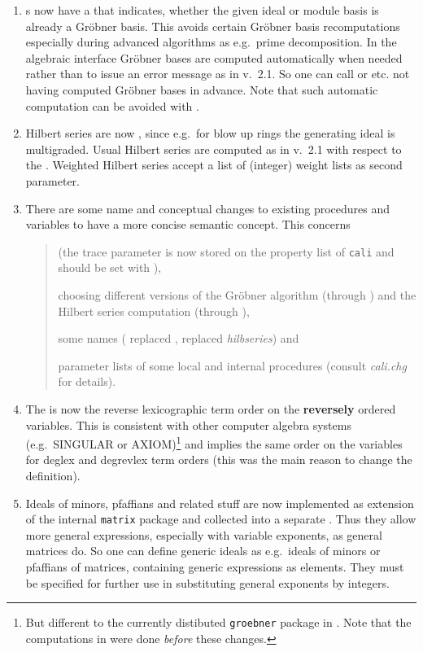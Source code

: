 \begin{enumerate}
\item {}s now have a  that indicates, whether the
given ideal or module basis is already a Gr\"obner basis. This avoids
certain Gr\"obner basis recomputations especially during advanced algorithms
as e.g.\ prime decomposition. In the algebraic interface Gr\"obner bases are
computed automatically when needed rather than to issue an error
message as in v.~2.1. So one can call  or 
etc. not having computed Gr\"obner bases in advance. Note that such
automatic computation can be avoided with .

\item Hilbert series are now , since
e.g.\ for blow up rings the generating ideal is multigraded. Usual
Hilbert series are computed as in v.~2.1 with respect to the
. Weighted Hilbert series accept a list of (integer)
weight lists as second parameter.

\item There are some name and conceptual changes to existing
procedures and variables to have a more concise semantic concept. This
concerns
\begin{quote}
 (the trace parameter is now stored on the property list
of \texttt{cali} and should be set with ),

choosing different versions of the Gr\"obner algorithm (through
) and the Hilbert series computation (through
),

some names ( replaced , 
replaced \emph{hilbseries}) and

parameter lists of some local and internal procedures (consult \emph{cali.chg} for details).
\end{quote}

\item The  is now the reverse lexicographic
term order on the \textbf{reversely} ordered variables. This is consistent
with other computer algebra systems (e.g.\ SINGULAR or
AXIOM)\footnote{But different to the currently distibuted \texttt{groebner} package in \REDUCE. Note that the computations in
\cite{Graebe:94a} were done \emph{before} these changes.} and implies the same
order on the variables for deglex and degrevlex term orders (this was
the main reason to change the definition).

\item Ideals of minors, pfaffians and related stuff are now
implemented as extension of the internal \texttt{matrix} package and
collected into a separate . Thus they allow more
general expressions, especially with variable exponents, as general
\REDUCE matrices do. So one can define generic ideals as e.g.\ ideals
of minors or pfaffians of matrices, containing generic expressions as
elements. They must be specified for further use in  substituting
general exponents by integers.

\end{enumerate}

